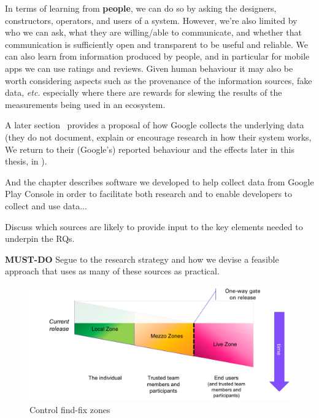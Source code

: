 In terms of learning from \textbf{people}, we can do so by asking the designers, constructors, operators, and users of a system. However, we're also limited by who we can ask, what they are willing/able to communicate, and whether that communication is sufficiently open and transparent to be useful and reliable. We can also learn from information produced by people, and in particular for mobile apps we can use ratings and reviews. Given human behaviour it may also be worth considering aspects such as the provenance of the information sources, fake data, \emph{etc.} especially where there are rewards for slewing the results of the measurements being used in an ecosystem.

A later section~\href{sec:platform-level-analytics}{\emph{}} provides a proposal of how Google collects the underlying data (they do not document, explain or encourage research in how their system works, We return to their (Google's) reported behaviour and the effects later in this thesis, in ). 

And the chapter \href{app:software-contributions}{\emph{}} describes software we developed to help collect data from Google Play Console in order to facilitate both research and to enable developers to collect and use data...

Discuss which sources are likely to provide input to the key elements needed to underpin the RQs.

\textbf{MUST-DO} Segue to the research strategy and how we devise a feasible approach that uses as many of these sources as practical.


\begin{figure}
    \includegraphics[width=\linewidth]{images/my/control-find-fix-zones-a.pdf}
    \caption{Control find-fix zones}
    \label{fig:my:control-find-fix-zones-overview}
\end{figure}

